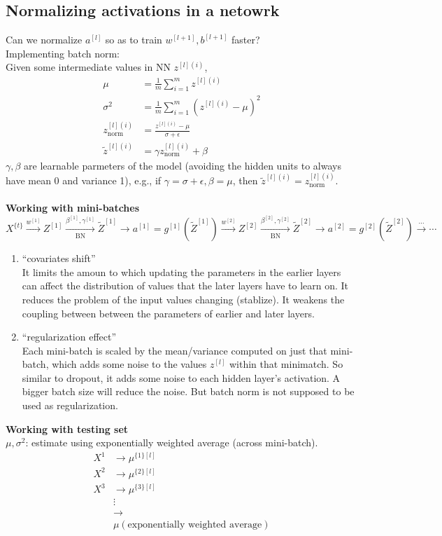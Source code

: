 %
\subsection{Normalizing activations in a netowrk}
Can we normalize $a^{[l]}$ so as to train $w^{[l+1]}, b^{[l+1]}$ faster?\\
Implementing batch norm:\\
Given some intermediate values in NN $z^{[l](i)}$,
\begin{align*}
\mu &= \frac{1}{m}\sum_{i = 1}^{m}z^{[l](i)}\\
\sigma^2 & = \frac{1}{m}\sum_{i = 1}^{m}(z^{[l](i)} - \mu)^2\\
z^{[l](i)}_{\text{norm}} &= \frac{z^{[l](i)} - \mu}{\sigma + \epsilon}\\
\tilde{z}^{[l](i)} &= \gamma z^{[l](i)}_{\text{norm}} + \beta
\end{align*}
$\gamma, \beta$ are learnable parmeters of the model (avoiding the hidden units to always have mean 0 and variance 1), e.g., if $\gamma = \sigma + \epsilon, \beta = \mu$, then $\tilde{z}^{[l](i)} = z^{[l](i)}_{\text{norm}}$.\\
\\
\textbf{Working with mini-batches}\\

$ X^{\{t\}} \xrightarrow[ ]{w^{[1]}} Z^{[1]} \xrightarrow[\text{BN}]{\beta^{[1]}, \gamma^{[1]}} \tilde{Z}^{[1]}  \rightarrow a^{[1]} = g^{[1]}(\tilde{Z}^{[1]}) \xrightarrow[]{w^{[2]}} Z^{[2]} \xrightarrow[\text{BN}]{\beta^{[2]}, \gamma^{[2]}} \tilde{Z}^{[2]}  \rightarrow a^{[2]} = g^{[2]}(\tilde{Z}^{[2]}) \xrightarrow[ ]{\cdots} \cdots$\\
\begin{enumerate}
\item
``covariates shift''\\
It limits the amoun to which updating the parameters in the earlier layers can affect the distribution of values that the later layers have to learn on. It reduces the problem of the input values changing (stablize). It weakens the coupling between between the parameters of earlier and later layers.
\item
``regularization effect''\\
Each mini-batch is scaled by the mean/variance computed on just that mini-batch, which adds some noise to the values $z^{[l]}$ within that minimatch. So similar to dropout, it adds some noise to each hidden layer's activation. A bigger batch size will reduce the noise. But batch norm is not supposed to be used as regularization.
\end{enumerate}
\textbf{Working with testing set}\\
$\mu, \sigma^2$: estimate using exponentially weighted average (across mini-batch).
\begin{align*}
X^{1} &\rightarrow \mu^{\{1\}[l]}\\
X^{2} &\rightarrow \mu^{\{2\}[l]}\\
X^{3} &\rightarrow \mu^{\{3\}[l]}\\
&\vdots\\
&\rightarrow\\
&\mu (\text{exponentially weighted average})
\end{align*}

